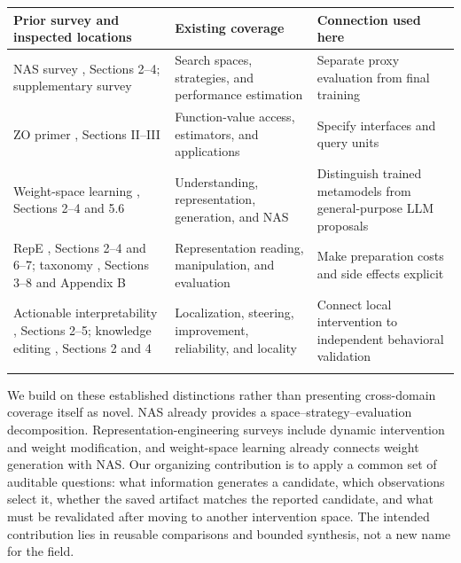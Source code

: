 \begin{longtable}{>{\raggedright\arraybackslash}p{4.85cm}>{\raggedright\arraybackslash}p{4.85cm}>{\raggedright\arraybackslash}p{4.85cm}}

\toprule

\textbf{Prior survey and inspected locations} & \textbf{Existing coverage} & \textbf{Connection used here}\\\midrule\endhead

NAS survey \cite{r131}, Sections 2–4; supplementary survey \cite{r143} & Search spaces, strategies, and performance estimation & Separate proxy evaluation from final training\\\addlinespace[3pt]

ZO primer \cite{r51}, Sections II–III & Function-value access, estimators, and applications & Specify interfaces and query units\\\addlinespace[3pt]

Weight-space learning \cite{r43}, Sections 2–4 and 5.6 & Understanding, representation, generation, and NAS & Distinguish trained metamodels from general-purpose LLM proposals\\\addlinespace[3pt]

RepE \cite{r86}, Sections 2–4 and 6–7; taxonomy \cite{r107}, Sections 3–8 and Appendix B & Representation reading, manipulation, and evaluation & Make preparation costs and side effects explicit\\\addlinespace[3pt]

Actionable interpretability \cite{r116}, Sections 2–5; knowledge editing \cite{r19}, Sections 2 and 4 & Localization, steering, improvement, reliability, and locality & Connect local intervention to independent behavioral validation\\\addlinespace[3pt]

\bottomrule\end{longtable}\endgroup

We build on these established distinctions rather than presenting cross-domain coverage itself as novel. NAS already provides a space–strategy–evaluation decomposition.\cite{r131} Representation-engineering surveys include dynamic intervention and weight modification,\cite{r86,r107} and weight-space learning already connects weight generation with NAS.\cite{r43} Our organizing contribution is to apply a common set of auditable questions: what information generates a candidate, which observations select it, whether the saved artifact matches the reported candidate, and what must be revalidated after moving to another intervention space. The intended contribution lies in reusable comparisons and bounded synthesis, not a new name for the field.


